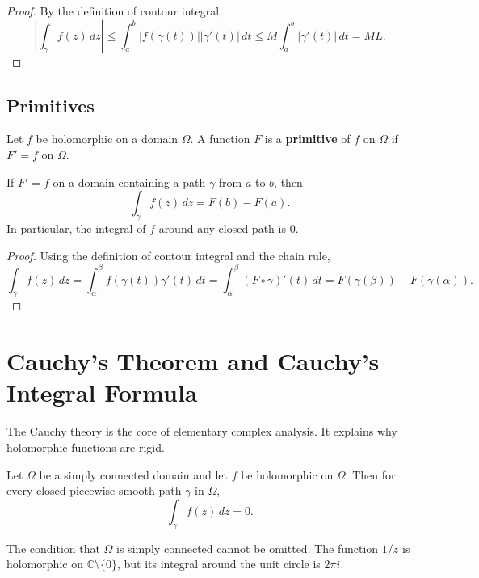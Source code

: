 \begin{proof}
By the definition of contour integral,
\[
    \left|\int_\gamma f(z)\,dz\right|
    \leq \int_a^b |f(\gamma(t))||\gamma'(t)|\,dt
    \leq M\int_a^b|\gamma'(t)|\,dt=ML.
\]
\end{proof}

\subsection{Primitives}

\begin{definition}[Primitive]
Let $f$ be holomorphic on a domain $\Omega$. A function $F$ is a \textbf{primitive} of $f$ on $\Omega$ if $F'=f$ on $\Omega$.
\end{definition}

\begin{theorem}
If $F'=f$ on a domain containing a path $\gamma$ from $a$ to $b$, then
\[
    \int_\gamma f(z)\,dz=F(b)-F(a).
\]
In particular, the integral of $f$ around any closed path is $0$.
\end{theorem}

\begin{proof}
Using the definition of contour integral and the chain rule,
\[
    \int_\gamma f(z)\,dz=\int_\alpha^\beta f(\gamma(t))\gamma'(t)\,dt
    =\int_\alpha^\beta (F\circ\gamma)'(t)\,dt=F(\gamma(\beta))-F(\gamma(\alpha)).
\]
\end{proof}

\section{Cauchy's Theorem and Cauchy's Integral Formula}

The Cauchy theory is the core of elementary complex analysis. It explains why holomorphic functions are rigid.

\begin{theorem}
Let $\Omega$ be a simply connected domain and let $f$ be holomorphic on $\Omega$. Then for every closed piecewise smooth path $\gamma$ in $\Omega$,
\[
    \int_\gamma f(z)\,dz=0.
\]
\end{theorem}

\begin{remark}
The condition that $\Omega$ is simply connected cannot be omitted. The function $1/z$ is holomorphic on $\mathbb{C}\setminus\{0\}$, but its integral around the unit circle is $2\pi i$.
\end{remark}

